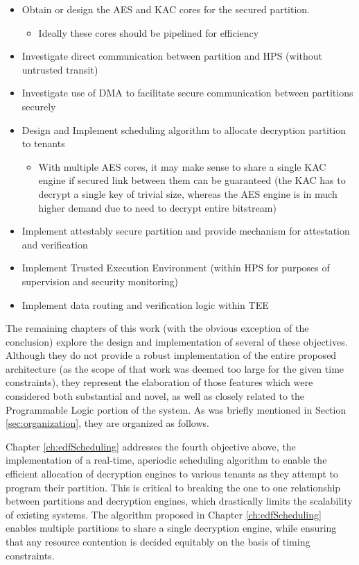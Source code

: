 \begin{itemize}
  \item Obtain or design the AES and KAC cores for the secured partition.
    \begin{itemize}  
      \item Ideally these cores should be pipelined for efficiency
    \end{itemize}
  \item Investigate direct communication between partition and HPS (without untrusted transit)
  \item Investigate use of DMA to facilitate secure communication between partitions securely
  \item Design and Implement scheduling algorithm to allocate decryption partition to tenants
    \begin{itemize}
      \item With multiple AES cores, it may make sense to share a single KAC engine if secured link between them can be guaranteed (the KAC has to decrypt a single key of trivial size, whereas the AES engine is in much higher demand due to need to decrypt entire bitstream)
    \end{itemize}
  \item Implement attestably secure partition and provide mechanism for attestation and verification
  \item Implement Trusted Execution Environment (within HPS for purposes of supervision and security monitoring)
  \item Implement data routing and verification logic within TEE
  \end{itemize}

The remaining chapters of this work (with the obvious exception of the conclusion) explore the design and implementation of several of these objectives. Although they do not provide a robust implementation of the entire proposed architecture (as the scope of that work was deemed too large for the given time constraints), they represent the elaboration of those features which were considered both substantial and novel, as well as closely related to the Programmable Logic portion of the system. As was briefly mentioned in Section \ref{sec:organization}, they are organized as follows.

Chapter \ref{ch:edfScheduling} addresses the fourth objective above, the implementation of a real-time, aperiodic scheduling algorithm to enable the efficient allocation of decryption engines to various tenants as they attempt to program their partition. This is critical to breaking the one to one relationship between partitions and decryption engines, which drastically limits the scalability of existing systems. The algorithm proposed in Chapter \ref{ch:edfScheduling} enables multiple partitions to share a single decryption engine, while ensuring that any resource contention is decided equitably on the basis of timing constraints.

